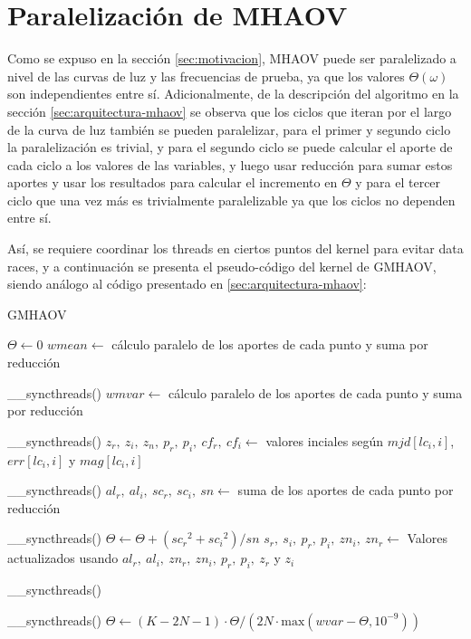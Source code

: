 \section{Paralelización de MHAOV}\label{sec:paralelización}
Como se expuso en la sección \ref{sec:motivacion}, MHAOV puede ser paralelizado a nivel de las curvas de luz y las frecuencias de prueba, ya que los valores $\Theta(\omega)$ son independientes entre sí. Adicionalmente, de la descripción del algoritmo en la sección \ref{sec:arquitectura-mhaov} se observa que los ciclos que iteran por el largo de la curva de luz también se pueden paralelizar, para el primer y segundo ciclo la paralelización es trivial, y para el segundo ciclo se puede calcular el aporte de cada ciclo a los valores de las variables, y luego usar reducción para sumar estos aportes y usar los resultados para calcular el incremento en $\Theta$ y para el tercer ciclo que una vez más es trivialmente paralelizable ya que los ciclos no dependen entre sí.

Así, se requiere coordinar los threads en ciertos puntos del kernel para evitar data races, y a continuación se presenta el pseudo-código del kernel de GMHAOV, siendo análogo al código presentado en \ref{sec:arquitectura-mhaov}:

\begin{algorithm}[H]
\caption{GMHAOV}\label{alg:gmhaov}
\begin{algorithmic}
        \State $\Theta \gets 0$
    \EndIf
    \State $wmean \gets$ cálculo paralelo de los aportes de cada punto y suma por reducción 

    \_\_syncthreads()
    \State $wmvar \gets$ cálculo paralelo de los aportes de cada punto y suma por reducción 

    \_\_syncthreads()
    \State $z_r, \ z_i, \ z_n, \ p_r, \ p_i, \ cf_r, \ cf_i \gets$ valores inciales según $mjd[lc_i, i]$, $err[lc_i, i]$ y $mag[lc_i, i]$

    \_\_syncthreads()
        \State $al_r, \ al_i, \ sc_r, \ sc_i, \ sn \gets$ suma de los aportes de cada punto por reducción

    \_\_syncthreads()
            \State $\Theta \gets \Theta + ({sc_r}^{2} + {sc_i}^{2})/sn$
        \EndIf
        \State $s_r, \ s_i, \ p_r, \ p_i, \ zn_i, \ zn_r \gets$ Valores actualizados usando $al_r, \ al_i, \ zn_r, \ zn_i, \ p_r, \ p_i, \ z_r$ y  $z_i$

    \_\_syncthreads()
    \EndFor

    \_\_syncthreads()
\State  $\Theta \gets (K-2N-1)\cdot \Theta / (2N\cdot \text{max}(wvar - \Theta, 10^{-9}))$
    \EndFunction
\end{algorithmic}
\end{algorithm}

